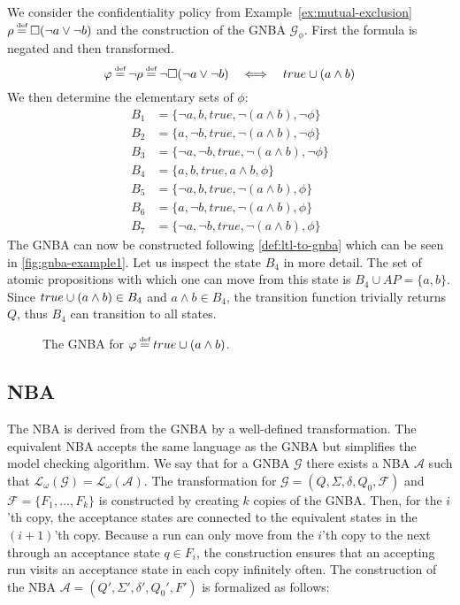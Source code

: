 \begin{example}
We consider the confidentiality policy from Example~\ref{ex:mutual-exclusion} $\conf \eqdef \G(\lnot a \lor \lnot b)$ and the construction of the GNBA $\mathcal{G}_\phi$. First the formula is negated and then transformed.
\begin{equation*}
    \phi \eqdef \lnot \conf \eqdef \lnot \G(\lnot a \lor \lnot b) \quad\Longleftrightarrow\quad true \U (a \land b)
\end{equation*}
We then determine the elementary sets of $\phi$:
\begin{align*}
    B_1 &= \{\lnot a, b, true, \lnot(a \land b), \lnot\phi\} \\
    B_2 &= \{a, \lnot b, true, \lnot(a \land b), \lnot\phi\} \\
    B_3 &= \{\lnot a, \lnot b, true, \lnot(a \land b), \lnot\phi\} \\
    B_4 &= \{a, b, true, a \land b, \phi\} \\
    B_5 &= \{\lnot a, b, true, \lnot(a \land b), \phi\} \\
    B_6 &= \{a, \lnot b, true, \lnot(a \land b), \phi\} \\
    B_7 &= \{\lnot a, \lnot b, true, \lnot(a \land b), \phi\}
\end{align*}
The GNBA can now be constructed following \autoref{def:ltl-to-gnba} which can be seen in \autoref{fig:gnba-example1}. Let us inspect the state $B_4$ in more detail. The set of atomic propositions with which one can move from this state is $B_4 \cup AP = \{a,b\}$. Since $true \cup (a \land b) \in B_4$ and $a \land b \in B_4$, the transition function trivially returns $Q$, thus $B_4$ can transition to all states.

\begin{figure}[!ht]
    \centering
    
    \caption{The GNBA for $\phi \eqdef true\U (a \land b)$.}
    \label{fig:gnba-example1}
\end{figure}
\end{example}

\subsection{NBA}\label{sec:nba}
The NBA is derived from the GNBA by a well-defined transformation. The equivalent NBA accepts the same language as the GNBA but simplifies the model checking algorithm. We say that for a GNBA $\mathcal{G}$ there exists a NBA $\mathcal{A}$ such that $\mathcal{L}_\omega(\mathcal{G})=\mathcal{L}_\omega(\mathcal{A})$. The transformation for $\mathcal{G}=(Q,\Sigma,\delta,Q_0,\mathcal{F})$ and $\mathcal{F}=\{F_1,\ldots,F_k\}$ is constructed by creating $k$ copies of the GNBA. Then, for the $i$'th copy, the acceptance states are connected to the equivalent states in the $(i+1)$'th copy. Because a run can only move from the $i$'th copy to the next through an acceptance state $q \in F_i$, the construction ensures that an accepting run visits an acceptance state in each copy infinitely often. The construction of the NBA $\mathcal{A}=(Q',\Sigma',\delta',Q_0',F')$ is formalized as follows:

